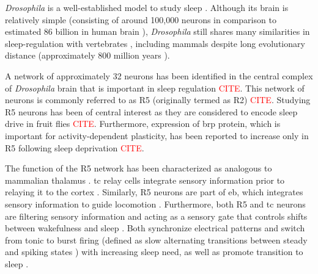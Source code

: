 \documentclass[../main.tex]{subfiles}
\begin{document}
\textit{Drosophila} is a well-established model to study sleep 
\parencite{liuSleepDriveEncoded2016,andreaniCircadianProgrammingEllipsoid2022,shaferRegulationDrosophilaSleep2021,dubowyCircadianRhythmsSleep2017}.
Although its brain is relatively simple (consisting of around 100,000 neurons \parencite{donleaRecurrentCircuitryBalancing2018} in comparison to
estimated 86 billion in human brain \parencite{herculano-houzelRemarkableNotExtraordinary2012}), \textit{Drosophila} still
shares many similarities in sleep-regulation with vertebrates \parencite{liuSleepDriveEncoded2016}, including
mammals \parencite{suarez-grimaltNeuralArchitectureSleep2021,dubowyCircadianRhythmsSleep2017} despite long
evolutionary distance (approximately 800 million years \parencite{williamsLongReachNAAG2021}).

A network of approximately 32 neurons has been identified in the central complex of \textit{Drosophila} brain that is important in sleep regulation \textcolor{red}{CITE}. This network of neurons is commonly referred to as R5 (originally termed as R2) \textcolor{red}{CITE}. Studying R5 neurons has been of central interest as they are considered to encode sleep drive in fruit flies \textcolor{red}{CITE}. Furthermore, expression of \gls{brp} protein, which is important for activity-dependent plasticity, has been reported to increase only in R5 following sleep deprivation \textcolor{red}{CITE}.

The function of the R5 network has been characterized as analogous to mammalian thalamus
\parencite{suarez-grimaltNeuralArchitectureSleep2021,raccugliaNetworkSpecificSynchronizationElectrical2019}.
\gls{tc} relay cells integrate sensory information prior to relaying it to the cortex \parencite{sampathkumarIntegrationSignalsDifferent2021}.
Similarly, R5 neurons are part of \gls{eb}, which integrates sensory information to guide locomotion \parencite{yanSubtypeSpecificRolesEllipsoid2023}. 
Furthermore, both R5 and \gls{tc} neurons are filtering sensory information and acting as a
sensory gate that controls shifts between wakefulness and sleep
\parencite{raccugliaCoherentMultilevelNetwork2022,gentThalamicDualControl2018}. Both
synchronize electrical patterns and switch from tonic to burst firing (defined as slow alternating transitions between steady and spiking states
\parencite{rinzelFormalClassificationBursting1987}) with increasing sleep need, as well as promote transition to sleep
\parencite{suarez-grimaltNeuralArchitectureSleep2021, raccugliaNetworkSpecificSynchronizationElectrical2019}.
\end{document}
